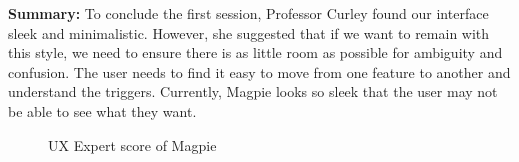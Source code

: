 \textbf{Summary: }
To conclude the first session, Professor Curley found our interface sleek and minimalistic. However, she suggested that if we want to remain with this style, we need to ensure there is as little room as possible for ambiguity and confusion. The user needs to find it easy to move from one feature to another and understand the triggers. Currently, Magpie looks so sleek that the user may not be able to see what they want.
\begin{figure}
    \centering
    \caption{UX Expert score of Magpie}
\end{figure}

\newpage
